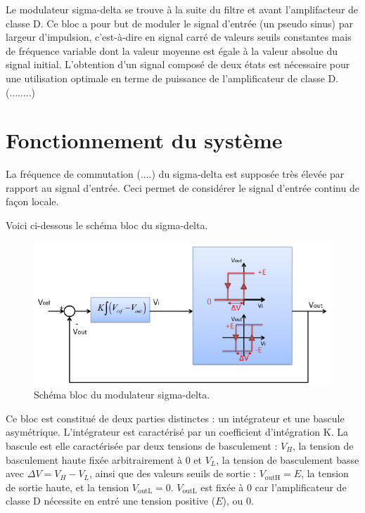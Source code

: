 
Le modulateur sigma-delta se trouve à la suite du filtre et avant l'amplifacteur de classe D. Ce bloc a pour but de moduler le signal d'entrée (un pseudo sinus) par largeur d'impulsion, c'est-à-dire en signal carré de valeurs seuils constantes mais de fréquence variable dont la valeur moyenne est égale à la valeur absolue du signal initial. L'obtention d'un signal composé de deux états est nécessaire pour une utilisation optimale en terme de puissance de l'amplificateur de classe D. (........)


\section{Fonctionnement du système}

La fréquence de commutation (....) du sigma-delta est supposée très élevée par rapport au signal d'entrée. Ceci permet de considérer le signal d'entrée continu de façon locale.


Voici ci-dessous le schéma bloc du sigma-delta.

\begin{figure}[ht]
	\centering
	\includegraphics[scale=0.7]{img-sigma-delta/schema-blocs.png}
	\caption{Schéma bloc du modulateur sigma-delta.}
	\label{fig:sigma-delta-schema-blocs}
\end{figure}

Ce bloc est constitué de deux parties distinctes : un intégrateur et une bascule asymétrique.
L'intégrateur est caractérisé par un coefficient d'intégration K. La bascule est elle caractérisée par deux tensions de basculement : $V_H$, la tension de basculement haute  fixée arbitrairement à 0 et $V_L$, la tension de basculement basse avec $\Delta V = V_H - V_L$, ainsi que des valeurs seuils de sortie : $V_{\text{outH}} = E$, la tension de sortie haute, et la tension $V_{\text{outL}} = 0$. $V_{\text{outL}}$ est fixée à 0 car l'amplificateur de classe D nécessite en entré une tension positive ($E$), ou 0.

